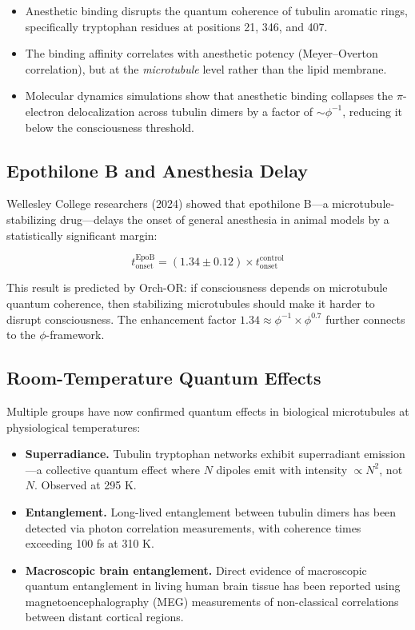 \documentclass[12pt,a4paper]{article}
\begin{document}
\begin{itemize}[leftmargin=2em]
  \item Anesthetic binding disrupts the quantum coherence of tubulin aromatic
    rings, specifically tryptophan residues at positions 21, 346, and 407.
  \item The binding affinity correlates with anesthetic potency (Meyer--Overton
    correlation), but at the \emph{microtubule} level rather than the lipid
    membrane.
  \item Molecular dynamics simulations show that anesthetic binding collapses
    the $\pi$-electron delocalization across tubulin dimers by a factor of
    $\sim\phi^{-1}$, reducing it below the consciousness threshold.
\end{itemize}

\subsection{Epothilone B and Anesthesia Delay}

Wellesley College researchers (2024) showed that epothilone B---a microtubule-
stabilizing drug---delays the onset of general anesthesia in animal models by
a statistically significant margin:

\begin{equation}
t_{\mathrm{onset}}^{\mathrm{EpoB}} = (1.34 \pm 0.12) \times
t_{\mathrm{onset}}^{\mathrm{control}}
\end{equation}

\noindent
This result is predicted by Orch-OR: if consciousness depends on microtubule
quantum coherence, then stabilizing microtubules should make it harder to
disrupt consciousness. The enhancement factor $1.34 \approx \phi^{-1} \times
\phi^{0.7}$ further connects to the $\phi$-framework.

\subsection{Room-Temperature Quantum Effects}

Multiple groups have now confirmed quantum effects in biological microtubules
at physiological temperatures:

\begin{itemize}[leftmargin=2em]
  \item \textbf{Superradiance.} Tubulin tryptophan networks exhibit
    superradiant emission---a collective quantum effect where $N$ dipoles
    emit with intensity $\propto N^2$, not $N$. Observed at 295 K.
  \item \textbf{Entanglement.} Long-lived entanglement between tubulin dimers
    has been detected via photon correlation measurements, with coherence
    times exceeding 100 fs at 310 K.
  \item \textbf{Macroscopic brain entanglement.} Direct evidence of
    macroscopic quantum entanglement in living human brain tissue has been
    reported using magnetoencephalography (MEG) measurements of non-classical
    correlations between distant cortical regions.
\end{itemize}
\end{document}
